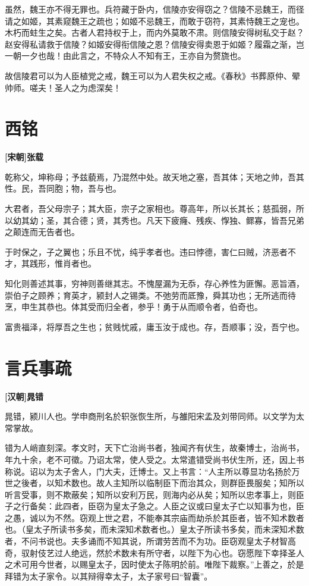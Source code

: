 \documentclass[UTF8,titlepage,oneside]{ctexbook}
\begin{document}
虽然，魏王亦不得无罪也。兵符藏于卧内，信陵亦安得窃之？信陵不忌魏王，而径请之如姬，其素窥魏王之疏也；如姬不忌魏王，而敢于窃符，其素恃魏王之宠也。木朽而蛀生之矣。古者人君持权于上，而内外莫敢不肃。则信陵安得树私交于赵？赵安得私请救于信陵？如姬安得衔信陵之恩？信陵安得卖恩于如姬？履霜之渐，岂一朝一夕也哉！由此言之，不特众人不知有王，王亦自为赘旒也。

故信陵君可以为人臣植党之戒，魏王可以为人君失权之戒。《春秋》书葬原仲、翚帅师。嗟夫！圣人之为虑深矣！


\chapter*{西铭}
\begin{center}
	\textbf{[宋朝]张载}
\end{center}

乾称父，坤称母；予兹藐焉，乃混然中处。故天地之塞，吾其体；天地之帅，吾其性。民，吾同胞；物，吾与也。

大君者，吾父母宗子；其大臣，宗子之家相也。尊高年，所以长其长；慈孤弱，所以幼其幼；圣，其合德；贤，其秀也。凡天下疲癃、残疾、惸独、鳏寡，皆吾兄弟之颠连而无告者也。

于时保之，子之翼也；乐且不忧，纯乎孝者也。违曰悖德，害仁曰贼，济恶者不才，其践形，惟肖者也。

知化则善述其事，穷神则善继其志。不愧屋漏为无忝，存心养性为匪懈。恶旨酒，崇伯子之顾养；育英才，颍封人之锡类。不弛劳而厎豫，舜其功也；无所逃而待烹，申生其恭也。体其受而归全者，参乎！勇于从而顺令者，伯奇也。

富贵福泽，将厚吾之生也；贫贱忧戚，庸玉汝于成也。存，吾顺事；没，吾宁也。


\chapter*{言兵事疏}
\begin{center}
	\textbf{[汉朝]晁错}
\end{center}

晁错，颍川人也。学申商刑名於轵张恢生所，与雒阳宋孟及刘带同师。以文学为太常掌故。

错为人峭直刻深。孝文时，天下亡治尚书者，独闻齐有伏生，故秦博士，治尚书，年九十余，老不可徵。乃诏太常，使人受之。太常遣错受尚书伏生所，还，因上书称说。诏以为太子舍人，门大夫，迁博士。又上书言：“人主所以尊显功名扬於万世之後者，以知术数也。故人主知所以临制臣下而治其众，则群臣畏服矣；知所以听言受事，则不欺蔽矣；知所以安利万民，则海内必从矣；知所以忠孝事上，则臣子之行备矣：此四者，臣窃为皇太子急之。人臣之议或曰皇太子亡以知事为也，臣之愚，诚以为不然。窃观上世之君，不能奉其宗庙而劫杀於其臣者，皆不知术数者也。（皇太子所读书多矣，而未深知术数者也。）皇太子所读书多矣，而未深知术数者，不问书说也。夫多诵而不知其说，所谓劳苦而不为功。臣窃观皇太子材智高奇，驭射伎艺过人绝远，然於术数未有所守者，以陛下为心也。窃愿陛下幸择圣人之术可用今世者，以赐皇太子，因时使太子陈明於前。唯陛下裁察。”上善之，於是拜错为太子家令。以其辩得幸太子，太子家号曰“智囊”。
\end{document}
